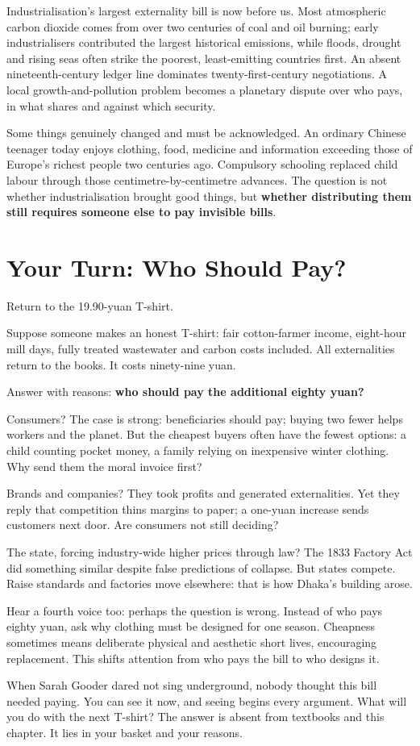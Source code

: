 Industrialisation's largest externality bill is now before us. Most atmospheric carbon dioxide comes from over two centuries of coal and oil burning; early industrialisers contributed the largest historical emissions, while floods, drought and rising seas often strike the poorest, least-emitting countries first. An absent nineteenth-century ledger line dominates twenty-first-century negotiations. A local growth-and-pollution problem becomes a planetary dispute over who pays, in what shares and against which security.

Some things genuinely changed and must be acknowledged. An ordinary Chinese teenager today enjoys clothing, food, medicine and information exceeding those of Europe's richest people two centuries ago. Compulsory schooling replaced child labour through those centimetre-by-centimetre advances. The question is not whether industrialisation brought good things, but \textbf{whether distributing them still requires someone else to pay invisible bills}.

\section{Your Turn: Who Should Pay?}
Return to the 19.90-yuan T-shirt.

Suppose someone makes an honest T-shirt: fair cotton-farmer income, eight-hour mill days, fully treated wastewater and carbon costs included. All externalities return to the books. It costs ninety-nine yuan.

Answer with reasons: \textbf{who should pay the additional eighty yuan?}

Consumers? The case is strong: beneficiaries should pay; buying two fewer helps workers and the planet. But the cheapest buyers often have the fewest options: a child counting pocket money, a family relying on inexpensive winter clothing. Why send them the moral invoice first?

Brands and companies? They took profits and generated externalities. Yet they reply that competition thins margins to paper; a one-yuan increase sends customers next door. Are consumers not still deciding?

The state, forcing industry-wide higher prices through law? The 1833 Factory Act did something similar despite false predictions of collapse. But states compete. Raise standards and factories move elsewhere: that is how Dhaka's building arose.

Hear a fourth voice too: perhaps the question is wrong. Instead of who pays eighty yuan, ask why clothing must be designed for one season. Cheapness sometimes means deliberate physical and aesthetic short lives, encouraging replacement. This shifts attention from who pays the bill to who designs it.

When Sarah Gooder dared not sing underground, nobody thought this bill needed paying. You can see it now, and seeing begins every argument. What will you do with the next T-shirt? The answer is absent from textbooks and this chapter. It lies in your basket and your reasons.
